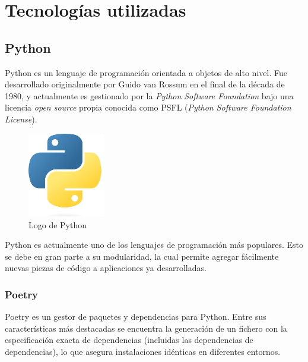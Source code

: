 
\chapter{Tecnologías utilizadas} %

\label{Chapter2} %


\section{Python}\label{sec:python}

Python es un lenguaje de programación orientada a objetos de alto nivel. Fue desarrollado originalmente por Guido van Rossum en el final de la década de 1980, y actualmente es gestionado por la \emph{Python Software Foundation} bajo una licencia \emph{open source} propia conocida como PSFL (\emph{Python Software Foundation License}). \emph{\parencite{Reference1}}

\begin{figure}[ht]
    \centering
    \includegraphics[width=0.3\textwidth]{Figures/python-logo}
    \decoRule
    \caption[Python (Logo)]{Logo de Python \emph{\parencite{Reference2}}}
    \label{fig:python-logo}
\end{figure}

Python es actualmente uno de los lenguajes de programación más populares. Esto se debe en gran parte a su modularidad, la cual permite agregar fácilmente nuevas piezas de código a aplicaciones ya desarrolladas. \emph{\parencite{Reference3}}

\subsection{Poetry}\label{sec:poetry}

Poetry es un gestor de paquetes y dependencias para Python. Entre sus características más destacadas se encuentra la generación de un fichero con la especificación exacta de dependencias (incluidas las dependencias de dependencias), lo que asegura instalaciones idénticas en diferentes entornos. \emph{\parencite{Reference6}}


